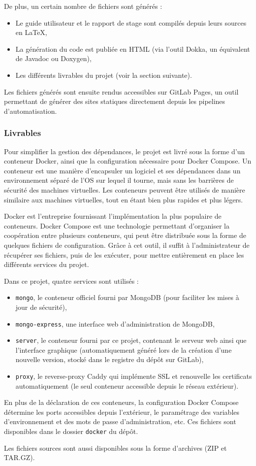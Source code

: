 De plus, un certain nombre de fichiers sont générés :
\begin{itemize}
	\item Le guide utilisateur et le rapport de stage sont compilés depuis leurs sources en \LaTeX,
	\item La génération du code est publiée en HTML (via l'outil Dokka, un équivalent de Javadoc ou Doxygen),
	\item Les différents livrables du projet (voir la section suivante).
\end{itemize}
Les fichiers générés sont ensuite rendus accessibles sur GitLab Pages, un outil permettant de générer des sites statiques directement depuis les pipelines d'automatisation.

\subsubsection{Livrables}

Pour simplifier la gestion des dépendances, le projet est livré sous la forme d'un conteneur Docker, ainsi que la configuration nécessaire pour Docker Compose.
Un conteneur est une manière d'encapsuler un logiciel et ses dépendances dans un environnement séparé de l'OS sur lequel il tourne, mais sans les barrières de sécurité des machines virtuelles.
Les conteneurs peuvent être utilisés de manière similaire aux machines virtuelles, tout en étant bien plus rapides et plus légers.

Docker est l'entreprise fournissant l'implémentation la plus populaire de conteneurs.
Docker Compose est une technologie permettant d'organiser la coopération entre plusieurs conteneurs, qui peut être distribuée sous la forme de quelques fichiers de configuration.
Grâce à cet outil, il suffit à l'administrateur de récupérer ses fichiers, puis de les exécuter, pour mettre entièrement en place les différents services du projet.

Dans ce projet, quatre services sont utilisés :
\begin{itemize}
	\item \lstinline{mongo}, le conteneur officiel fourni par MongoDB (pour faciliter les mises à jour de sécurité),
	\item \lstinline{mongo-express}, une interface web d'administration de MongoDB,
	\item \lstinline{server}, le conteneur fourni par ce projet, contenant le serveur web ainsi que l'interface graphique (automatiquement généré lors de la création d'une nouvelle version, stocké dans le registre du dépôt sur GitLab),
	\item \lstinline{proxy}, le reverse-proxy Caddy qui implémente SSL et renouvelle les certificats automatiquement (le seul conteneur accessible depuis le réseau extérieur).
\end{itemize}
En plus de la déclaration de ces conteneurs, la configuration Docker Compose détermine les ports accessibles depuis l'extérieur, le paramétrage des variables d'environnement et des mots de passe d'administration, etc.
Ces fichiers sont disponibles dans le dossier \lstinline{docker} du dépôt.

Les fichiers sources sont aussi disponibles sous la forme d'archives (ZIP et TAR.GZ).
